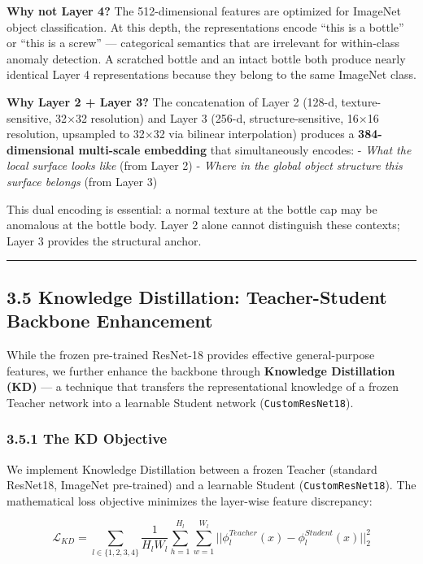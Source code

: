 \textbf{Why not Layer 4?} The 512-dimensional features are optimized for ImageNet object classification. At this depth, the representations encode ``this is a bottle'' or ``this is a screw'' --- categorical semantics that are irrelevant for within-class anomaly detection. A scratched bottle and an intact bottle both produce nearly identical Layer 4 representations because they belong to the same ImageNet class.

\textbf{Why Layer 2 + Layer 3?} The concatenation of Layer 2 (128-d, texture-sensitive, 32×32 resolution) and Layer 3 (256-d, structure-sensitive, 16×16 resolution, upsampled to 32×32 via bilinear interpolation) produces a \textbf{384-dimensional multi-scale embedding} that simultaneously encodes: - \emph{What the local surface looks like} (from Layer 2) - \emph{Where in the global object structure this surface belongs} (from Layer 3)

This dual encoding is essential: a normal texture at the bottle cap may be anomalous at the bottle body. Layer 2 alone cannot distinguish these contexts; Layer 3 provides the structural anchor.

\begin{center}\rule{0.5\linewidth}{0.5pt}\end{center}

\subsection{3.5 Knowledge Distillation: Teacher-Student Backbone Enhancement}\label{knowledge-distillation-teacher-student-backbone-enhancement}

While the frozen pre-trained ResNet-18 provides effective general-purpose features, we further enhance the backbone through \textbf{Knowledge Distillation (KD)} --- a technique that transfers the representational knowledge of a frozen Teacher network into a learnable Student network (\texttt{CustomResNet18}).

\subsubsection{3.5.1 The KD Objective}\label{the-kd-objective}

We implement Knowledge Distillation between a frozen Teacher (standard ResNet18, ImageNet pre-trained) and a learnable Student (\texttt{CustomResNet18}). The mathematical loss objective minimizes the layer-wise feature discrepancy:

\[ \mathcal{L}_{KD} = \sum_{l \in \{1,2,3,4\}} \frac{1}{H_l W_l} \sum_{h=1}^{H_l} \sum_{w=1}^{W_l} || \phi_l^{Teacher}(x) - \phi_l^{Student}(x) ||_2^2 \]

